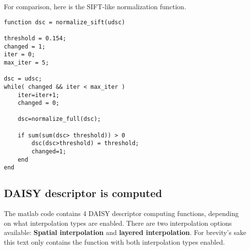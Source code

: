 For comparison, here is the SIFT-like normalization function.
\begin{lstlisting}
function dsc = normalize_sift(udsc)

threshold = 0.154;
changed = 1;
iter = 0;
max_iter = 5;

dsc = udsc;
while( changed && iter < max_iter )
    iter=iter+1;
    changed = 0;

    dsc=normalize_full(dsc);

    if sum(sum(dsc> threshold)) > 0
        dsc(dsc>threshold) = threshold;
        changed=1;
    end
end
\end{lstlisting}


\subsection{DAISY descriptor is computed}

The matlab code contains 4 DAISY descriptor computing functions, depending on
what interpolation types are enabled. There are two interpolation options
available: \textbf{Spatial interpolation} and \textbf{layered interpolation}.
For brevity's sake this text only contains the function with both interpolation
types enabled.






